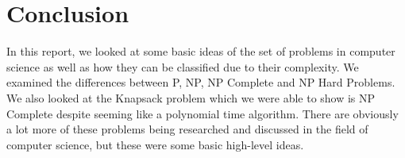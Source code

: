 \documentclass{article}
\begin{document}
    \section*{Conclusion}
    In this report, we looked at some basic ideas of the set of problems in computer science as well as how they can be classified due to their complexity. We examined the differences between P, NP, NP Complete and NP Hard Problems. We also looked at the Knapsack problem which we were able to show is NP Complete despite seeming like a polynomial time algorithm. There are obviously a lot more of these problems being researched and discussed in the field of computer science, but these were some basic high-level ideas. 
    
    
    
        
        
        
        
\end{document}
